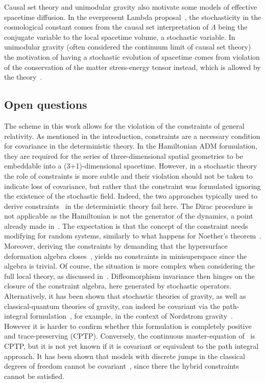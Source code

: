 \documentclass[amsmath,amssymb,11pt]{article}
\begin{document}
Causal set theory and unimodular gravity also motivate some models of effective spacetime diffusion. In the everpresent Lambda proposal~\cite{ahmed2004everpresent}, the stochasticity in the cosmological constant comes from the causal set interpretation of $\Lambda$ being the conjugate variable to the local spacetime volume, a stochastic variable. In unimodular gravity (often considered the continuum limit of causal set theory) the motivation of having a stochastic evolution of spacetime comes from violation of the conservation of the matter stress-energy tensor instead, which is allowed by the theory~\cite{perez2021resolving,landau2022cosmological}. 

\subsection{Open questions}
The scheme in this work allows for the violation of the constraints of general relativity. 
As mentioned in the introduction, constraints are a necessary condition for covariance in the deterministic theory. In the Hamiltonian ADM formulation, they are required for the series of three-dimensional spatial geometries to be embeddable into a (3+1)-dimensional spacetime. However, in a stochastic theory the role of constraints is more subtle and their violation should not be taken to indicate loss of covariance, but rather that the constraint was formulated ignoring the existence of the stochastic field. Indeed, the two approaches typically used to derive constraints~\cite{dirac1967lectures,hojman1976geometrodynamics} in the deterministic theory fail here. The Dirac procedure is not applicable as the Hamiltonian is not the generator of the dynamics, a point already made in~\cite{oppenheim2021constraints}. The expectation is that the concept of the  constraint needs modifying for random systems, similarly to what happens for Noether's theorem~\cite{misawa1999conserved, albeverio1995remark,oppenheim2009fundamental}. Moreover, deriving the constraints by demanding that the hypersurface deformation algebra closes~\cite{hojman1976geometrodynamics}, yields no constraints in minisuperspace since the algebra is trivial. Of course, the situation is more complex when considering the full local theory, as discussed in~\cite{oppenheim2021constraints}. Diffeomorphism invariance then hinges on the closure of the constraint algebra, here generated by stochastic operators. Alternatively, it has been shown that stochastic theories of gravity, as well as classical-quantum theories of gravity, can indeed be covariant via the path-integral formulation~\cite{oppenheim2023covariant}, for example, in the context of Nordstrom gravity~\cite{oppenheim2024diffeomorphism}. However it is harder to confirm whether this formulation is completely positive and trace-preserving (CPTP). Conversely, the continuous master-equation of~\cite{oppenheim2021postquantum} is CPTP, but it is not yet known if it is covariant or equivalent to the path integral approach. It has been shown that models with discrete jumps in the classical degrees of freedom cannot be covariant~\cite{oppenheim2021constraints}, since there the hybrid constraints cannot be satisfied. 
\end{document}
